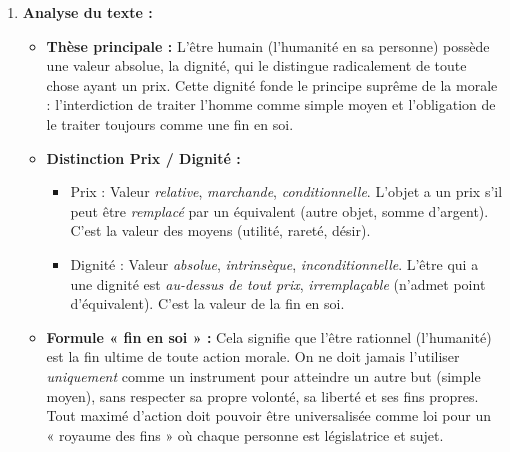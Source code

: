 \documentclass[11pt]{article}
\newcommand{\cle}[1]{{\popxbold\color{popdark}#1}}
\begin{document}
\begin{corrige}

\begin{enumerate}
    \item \textbf{Analyse du texte :}
    \begin{itemize}
        \item[a)] \textbf{Thèse principale :} L'être humain (l'humanité en sa personne) possède une \cle{valeur absolue}, la \cle{dignité}, qui le distingue radicalement de toute \cle{chose} ayant un \cle{prix}. Cette dignité fonde le \cle{principe suprême de la morale} : l'interdiction de traiter l'homme comme simple moyen et l'obligation de le traiter toujours comme une fin en soi.
        \item[b)] \textbf{Distinction Prix / Dignité :}
        \begin{itemize}
            \item \cle{Prix} : Valeur \emph{relative}, \emph{marchande}, \emph{conditionnelle}. L'objet a un prix s'il peut être \emph{remplacé} par un équivalent (autre objet, somme d'argent). C'est la valeur des \cle{moyens} (utilité, rareté, désir).
            \item \cle{Dignité} : Valeur \emph{absolue}, \emph{intrinsèque}, \emph{inconditionnelle}. L'être qui a une dignité est \emph{au-dessus de tout prix}, \emph{irremplaçable} (n'admet point d'équivalent). C'est la valeur de la \cle{fin en soi}.
        \end{itemize}
        \item[c)] \textbf{Formule « fin en soi » :} Cela signifie que l'être rationnel (l'humanité) est la \cle{fin ultime} de toute action morale. On ne doit jamais l'utiliser \emph{uniquement} comme un instrument pour atteindre un autre but (simple moyen), sans respecter sa propre \cle{volonté}, sa \cle{liberté} et ses \cle{fins propres}. Tout maximé d'action doit pouvoir être universalisée comme loi pour un « royaume des fins » où chaque personne est législatrice et sujet.
    \end{itemize}


\end{enumerate}
\end{corrige}
\end{document}
